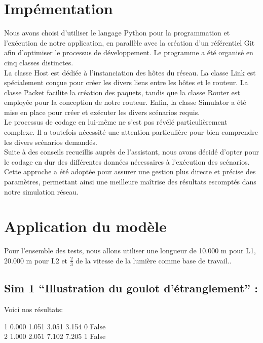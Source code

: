 \documentclass[a4paper, 12pt]{report}
\begin{document}
\section*{Impémentation}

Nous avons choisi d'utiliser le langage Python pour la programmation et l'exécution de notre application, en parallèle avec la création d'un référentiel Git afin d'optimiser le processus de développement. Le programme a été organisé en cinq classes distinctes.\\

La classe Host est dédiée à l'instanciation des hôtes du réseau. La classe Link est spécialement conçue pour créer les divers liens entre les hôtes et le routeur. La classe Packet facilite la création des paquets, tandis que la classe Router est employée pour la conception de notre routeur. Enfin, la classe Simulator a été mise en place pour créer et exécuter les divers scénarios requis.\\

Le processus de codage en lui-même ne s'est pas révélé particulièrement complexe. Il a toutefois nécessité une attention particulière pour bien comprendre les divers scénarios demandés.\\

Suite à des conseils recueillis auprès de l'assistant, nous avons décidé d'opter pour le codage en dur des différentes données nécessaires à l'exécution des scénarios. Cette approche a été adoptée pour assurer une gestion plus directe et précise des paramètres, permettant ainsi une meilleure maîtrise des résultats escomptés dans notre simulation réseau.


\section*{Application du modèle}
Pour l'ensemble des tests, nous allons utiliser une longueur de 10.000 m pour L1, 20.000 m pour L2 et $\frac{2}{3}$ de la vitesse de la lumière comme base de travail.. 
\subsection*{Sim 1 “Illustration du goulot d’étranglement” :}
Voici nos résultats:
\begin{center}
1 0.000 1.051 3.051 3.154 0 False\\
2 1.000 2.051 7.102 7.205 1 False
\end{center}
\end{document}
